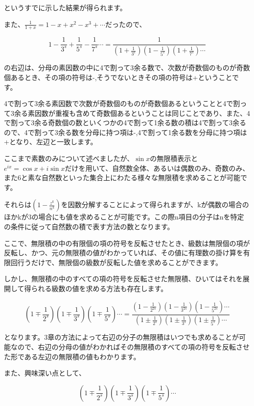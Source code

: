\documentclass[a4paper]{jsarticle}
\theoremstyle{break}
\begin{document}
というすでに示した結果が得られます。

また、$\frac{1}{1+x}=1-x+x^2-x^3+\cdots$だったので、

\[1-\frac{1}{3^s}+\frac{1}{5^s}-\frac{1}{7^s}\cdots =\frac{1}{\left( 1+\frac{1}{3^s} \right)\left( 1-\frac{1}{5^s} \right)\left( 1+\frac{1}{7^s} \right)\cdots}\]

の右辺は、分母の素因数の中に4で割って3余る数で、次数が奇数個のものが奇数個あるとき、その項の符号は-,そうでないときその項の符号は+ということです。

4で割って3余る素因数で次数が奇数個のものが奇数個あるということと4で割って3余る素因数が重複も含めて奇数個あるということは同じことであり、また、4で割って3余る奇数個の数といくつかの4で割って1余る数の積は4で割って3余るので、4で割って3余る数を分母に持つ項は-,4で割って1余る数を分母に持つ項は+となり、左辺と一致します。

ここまで素数のみについて述べましたが、$\sin x$の無限積表示と$e^{ix}=\cos x+i\sin x$だけを用いて、自然数全体、あるいは偶数のみ、奇数のみ、また6と素な自然数といった集合上にわたる様々な無限積を求めることが可能です。

それらは$\left( 1-\frac{z^k}{n^k} \right)$を因数分解することによって得られますが、kが偶数の場合のほかkが3の場合にも値を求めることが可能です。この際n項目の分子はnを特定の条件に従って自然数の積で表す方法の数となります。

ここで、無限積の中の有限個の項の符号を反転させたとき、級数は無限個の項が反転し、かつ、元の無限積の値がわかっていれば、その値に有理数の掛け算を有限回行うだけで、無限個の級数が反転した値を求めることができます。

しかし、無限積の中のすべての項の符号を反転させた無限積、ひいてはそれを展開して得られる級数の値を求める方法も存在します。

\[\left( 1\mp \frac{1}{2^s} \right)\left( 1\mp \frac{1}{3^s} \right)\left( 1\mp\frac{1}{5^s} \right)\cdots=\frac{\left( 1-\frac{1}{2^{2s}} \right)\left( 1-\frac{1}{3^{2s}} \right)\left( 1-\frac{1}{5^{2s}} \right)\cdots}{\left( 1\pm \frac{1}{2^s} \right)\left( 1\pm \frac{1}{3^s} \right)\left( 1\pm\frac{1}{5^s} \right)\cdots}\]

となります。3章の方法によって右辺の分子の無限積はいつでも求めることが可能なので、右辺の分母の値がわかればその無限積のすべての項の符号を反転させた形である左辺の無限積の値もわかります。

また、興味深い点として、

\[\left( 1\mp \frac{1}{2^s} \right)\left( 1\mp \frac{1}{3^s} \right)\left( 1\mp\frac{1}{5^s} \right)\cdots\]
\end{document}
